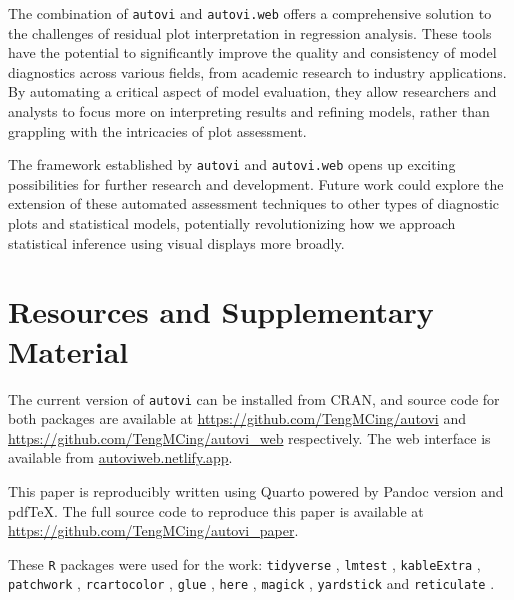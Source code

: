 \documentclass[
doublespace,
  times]{anzsauth}
\begin{document}
The combination of \texttt{autovi} and \texttt{autovi.web} offers a
comprehensive solution to the challenges of residual plot interpretation
in regression analysis. These tools have the potential to significantly
improve the quality and consistency of model diagnostics across various
fields, from academic research to industry applications. By automating a
critical aspect of model evaluation, they allow researchers and analysts
to focus more on interpreting results and refining models, rather than
grappling with the intricacies of plot assessment.

The framework established by \texttt{autovi} and \texttt{autovi.web}
opens up exciting possibilities for further research and development.
Future work could explore the extension of these automated assessment
techniques to other types of diagnostic plots and statistical models,
potentially revolutionizing how we approach statistical inference using
visual displays more broadly.

\section{Resources and Supplementary
Material}\label{resources-and-supplementary-material}

The current version of \texttt{autovi} can be installed from CRAN, and
source code for both packages are available at
\url{https://github.com/TengMCing/autovi} and
\url{https://github.com/TengMCing/autovi_web} respectively. The web
interface is available from \url{autoviweb.netlify.app}.

This paper is reproducibly written using Quarto
\citep{Allaire_Quarto_2024} powered by Pandoc version
\citep{MacFarlane_Pandoc} and pdfTeX. The full source code to reproduce
this paper is available at
\url{https://github.com/TengMCing/autovi_paper}.

These \texttt{R} packages were used for the work: \texttt{tidyverse}
\citep{tidyverse}, \texttt{lmtest} \citep{lmtest}, \texttt{kableExtra}
\citep{kableextra}, \texttt{patchwork} \citep{patchwork},
\texttt{rcartocolor} \citep{rcartocolor}, \texttt{glue} \citep{glue},
\texttt{here} \citep{here}, \texttt{magick} \citep{magick},
\texttt{yardstick} \citep{yardstick} and \texttt{reticulate}
\citep{reticulate}.


  
\end{document}
